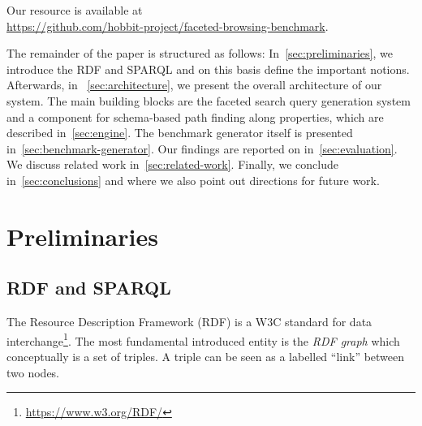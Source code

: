Our resource is available at \\ \url{https://github.com/hobbit-project/faceted-browsing-benchmark}.

The remainder of the paper is structured as follows:
In~\autoref{sec:preliminaries}, we introduce the RDF and SPARQL and on this basis define the important notions.
Afterwards, in ~\autoref{sec:architecture}, we present the overall architecture of our system. The main building blocks are the faceted search query generation system and a component for schema-based path finding along properties, which are described in~\autoref{sec:engine}.
The benchmark generator itself is presented in~\autoref{sec:benchmark-generator}.
Our findings are reported on in~\autoref{sec:evaluation}.
We discuss related work in~\autoref{sec:related-work}. Finally, we conclude in~\autoref{sec:conclusions} and where we also point out directions for future work.




\section{Preliminaries}
\label{sec:preliminaries}

\subsection{RDF and SPARQL}
The Resource Description Framework (RDF) is a W3C standard for data interchange\footnote{\url{https://www.w3.org/RDF/}}.
The most fundamental introduced entity is the \emph{RDF graph} which conceptually is a set of triples.
A triple can be seen as a labelled ``link'' between two nodes.

